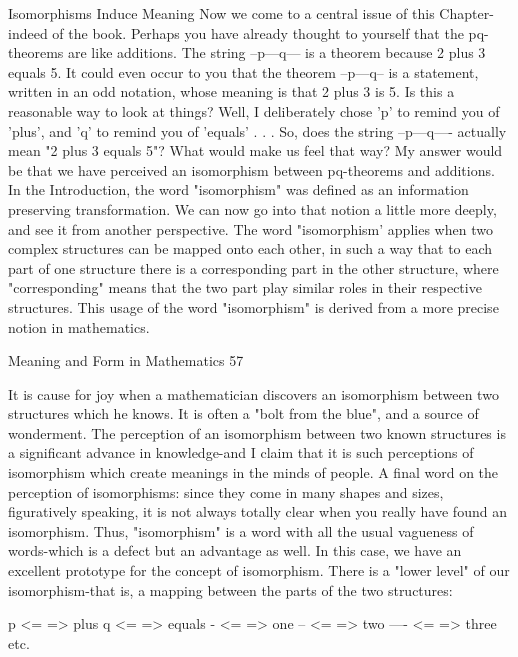                           Isomorphisms Induce Meaning
Now we come to a central issue of this Chapter-indeed of the book. Perhaps you have
already thought to yourself that the pq-theorems are like additions. The string --p---q--- is
a theorem because 2 plus 3 equals 5. It could even occur to you that the theorem --p---q--
is a statement, written in an odd notation, whose meaning is that 2 plus 3 is 5. Is this a
reasonable way to look at things? Well, I deliberately chose 'p' to remind you of 'plus',
and 'q' to remind you of 'equals' . . . So, does the string --p---q---- actually mean "2 plus
3 equals 5"?
         What would make us feel that way? My answer would be that we have perceived
an isomorphism between pq-theorems and additions. In the Introduction, the word
"isomorphism" was defined as an information preserving transformation. We can now go
into that notion a little more deeply, and see it from another perspective. The word
"isomorphism' applies when two complex structures can be mapped onto each other, in
such a way that to each part of one structure there is a corresponding part in the other
structure, where "corresponding" means that the two part play similar roles in their
respective structures. This usage of the word "isomorphism" is derived from a more
precise notion in mathematics.




Meaning and Form in Mathematics                                                           57

        It is cause for joy when a mathematician discovers an isomorphism between two
structures which he knows. It is often a "bolt from the blue", and a source of
wonderment. The perception of an isomorphism between two known structures is a
significant advance in knowledge-and I claim that it is such perceptions of isomorphism
which create meanings in the minds of people. A final word on the perception of
isomorphisms: since they come in many shapes and sizes, figuratively speaking, it is not
always totally clear when you really have found an isomorphism. Thus, "isomorphism" is
a word with all the usual vagueness of words-which is a defect but an advantage as well.
        In this case, we have an excellent prototype for the concept of isomorphism.
There is a "lower level" of our isomorphism-that is, a mapping between the parts of the
two structures:

                                         p <= => plus
                                        q <= => equals
                                         - <= => one
                                         -- <= => two
                                        ---- <= => three
                                               etc.

